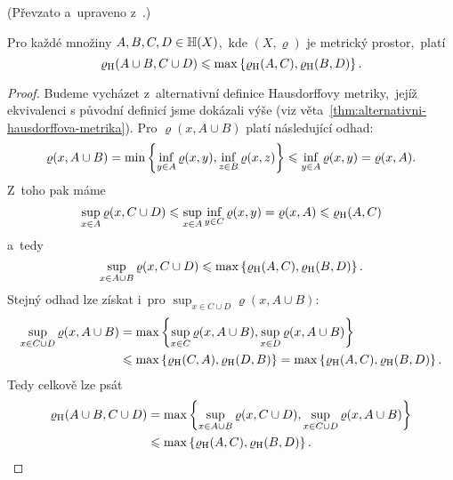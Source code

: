 (Převzato a~upraveno z~\citep[str. 79]{Barnsley1993}.)
\begin{lemma}\label{lem:hausdorffova-metrika-odhad-sjednoceni}
    Pro každé množiny $A,B,C,D\in\mathbb{H}(X)$,~kde $(X,\varrho)$ je metrický prostor,~platí
    \[\varrho_\textup{H}(A\cup B,C\cup D)\leqslant\max\left\{\varrho_\textup{H}(A,C),\varrho_\textup{H}(B,D)\right\}.\]
\end{lemma}
\begin{proof}
    Budeme vycházet z~alternativní definice Hausdorffovy metriky,~jejíž ekvivalenci s původní definicí jsme dokázali výše (viz věta~\ref{thm:alternativni-hausdorffova-metrika}). Pro $\varrho(x,A\cup B)$ platí následující odhad:
    \[\varrho(x,A\cup B)=\min\left\{\inf_{y\in A}\varrho(x,y),\inf_{z\in B}\varrho(x,z)\right\}\leqslant\inf_{y\in A}\varrho(x,y)=\varrho(x,A).\]
    Z~toho pak máme
    \[\sup_{x\in A}\varrho(x,C\cup D)\leqslant\sup_{x\in A}\inf_{y\in C}\varrho(x,y)=\varrho(x,A)\leqslant\varrho_\textup{H}(A,C)\]
    a~tedy
    \[\sup_{x\in A\cup B}\varrho(x,C\cup D)\leqslant\max\left\{\varrho_\textup{H}(A,C),\varrho_\textup{H}(B,D)\right\}.\]
    Stejný odhad lze získat i~pro $\sup_{x\in C\cup D}\varrho(x,A\cup B)$:
    \begin{align*}
        \sup_{x\in C\cup D}\varrho(x,A\cup B)&=\max\left\{\sup_{x\in C}\varrho(x,A\cup B),\sup_{x\in D}\varrho(x,A\cup B)\right\}\\
        &\leqslant\max\left\{\varrho_\textup{H}(C,A),\varrho_\textup{H}(D,B)\right\}=\max\left\{\varrho_\textup{H}(A,C),\varrho_\textup{H}(B,D)\right\}.
    \end{align*}
    Tedy celkově lze psát
    \begin{align*}
        \varrho_\textup{H}(A\cup B,C\cup D)&=\max\left\{\sup_{x\in A\cup B}\varrho(x,C\cup D),\sup_{x\in C\cup D}\varrho(x,A\cup B)\right\}\\
        &\leqslant\max\left\{\varrho_\textup{H}(A,C),\varrho_\textup{H}(B,D)\right\}.
    \end{align*}
\end{proof}

